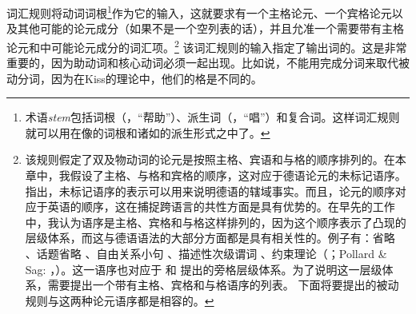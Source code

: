 \noindent
词汇规则将动词词根\footnote{%
术语\emph{stem}包括词根（，“帮助”）、派生词（，“唱”）和复合词。这样词汇规则就可以用在像的词根和诸如的派生形式之中了。
}作为它的输入，这就要求有一个主格论元、一个宾格论元以及其他可能的论元成分（如果不是一个空列表的话），并且允准一个需要带有主格论元和中可能论元成分的词汇项。\footnote{%
该规则假定了双及物动词的论元是按照主格、宾语和与格的顺序排列的。在本章中，我假设了主格、与格和宾格的顺序，这对应于德语论元的未标记语序。 \citet{Kiss2001a}指出，未标记语序的表示可以用来说明德语的辖域事实。而且，论元的顺序对应于英语的顺序，这在捕捉跨语言的共性方面是具有优势的。在早先的工作中，我认为语序是主格、宾格和与格这样排列的，因为这个顺序表示了凸现的层级体系，而这与德语语法的大部分方面都是具有相关性的。例子有：省略 \citep{Klein85}、话题省略 \citep{Fries88b}、自由关系小句 \citep{Bausewein90,Pittner95b,Mueller99b}、描述性次级谓词 \citep{Mueller2001c,Mueller2002b,Mueller2008a}、约束理论（\citealp{Grewendorf85a}；Pollard \& Sag: \citeyear{PS92}，\citeyear[\S~6]{ps2}）。这一语序也对应于 \citet{KC77a}和 \citet{Pullum77a}提出的旁格层级体系。为了说明这一层级体系，需要提出一个带有主格、宾格和与格语序的列表。
下面将要提出的被动规则与这两种论元语序都是相容的。
} 该词汇规则的输入指定了输出词的\vformvc。这是非常重要的，因为助动词和核心动词必须一起出现。比如说，不能用完成分词来取代被动分词，因为在Kiss的理论中，他们的格是不同的。
